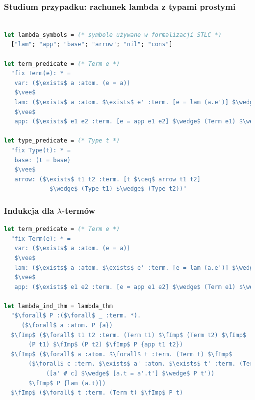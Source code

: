 \documentclass[aspectratio=169]{beamer}
\begin{document}
\begin{frame}[fragile]
\frametitle{Studium przypadku: rachunek lambda z typami prostymi}
\begin{lstlisting}[mathescape,language=OCaml,escapebegin=\color{codepurple}]

let lambda_symbols = (* symbole używane w formalizacji STLC *)
  ["lam"; "app"; "base"; "arrow"; "nil"; "cons"]

let term_predicate = (* Term e *)
  "fix Term(e): * =
   var: ($\exists$ a :atom. (e = a))
   $\vee$
   lam: ($\exists$ a :atom. $\exists$ e' :term. [e = lam (a.e')] $\wedge$ (Term e'))
   $\vee$
   app: ($\exists$ e1 e2 :term. [e = app e1 e2] $\wedge$ (Term e1) $\wedge$ (Term e2))"

let type_predicate = (* Type t *)
  "fix Type(t): * =
   base: (t = base)
   $\vee$
   arrow: ($\exists$ t1 t2 :term. [t $\ceq$ arrow t1 t2]
             $\wedge$ (Type t1) $\wedge$ (Type t2))"
\end{lstlisting}
\end{frame}

\begin{frame}[fragile]
\frametitle{Indukcja dla $\lambda$-termów}
\begin{lstlisting}[mathescape,language=OCaml,escapebegin=\color{codepurple}]
let term_predicate = (* Term e *)
  "fix Term(e): * =
   var: ($\exists$ a :atom. (e = a))
   $\vee$
   lam: ($\exists$ a :atom. $\exists$ e' :term. [e = lam (a.e')] $\wedge$ (Term e'))
   $\vee$
   app: ($\exists$ e1 e2 :term. [e = app e1 e2] $\wedge$ (Term e1) $\wedge$ (Term e2))"

let lambda_ind_thm = lambda_thm
  "$\forall$ P :($\forall$ _ :term. *).
     ($\forall$ a :atom. P {a})
  $\fImp$ ($\forall$ t1 t2 :term. (Term t1) $\fImp$ (Term t2) $\fImp$
       (P t1) $\fImp$ (P t2) $\fImp$ P {app t1 t2})
  $\fImp$ ($\forall$ a :atom. $\forall$ t :term. (Term t) $\fImp$
       ($\forall$ c :term. $\exists$ a' :atom. $\exists$ t' :term. (Term t') $\wedge$
            ([a' # c] $\wedge$ [a.t = a'.t'] $\wedge$ P t'))
       $\fImp$ P {lam (a.t)})
  $\fImp$ ($\forall$ t :term. (Term t) $\fImp$ P t)
\end{lstlisting}
\end{frame}

\end{document}
